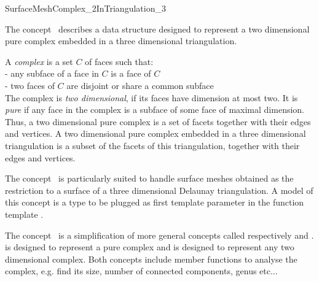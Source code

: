 

\begin{ccRefConcept}{SurfaceMeshComplex_2InTriangulation_3}


\ccDefinition
  
The concept \ccRefName\ describes a data structure
designed  to represent a  two dimensional pure complex 
embedded in a three dimensional triangulation.

A {\em complex} is a set $C$ of faces such that:\\
- any subface of a face in $C$ is a face of $C$ \\
- two faces of $C$ are disjoint or share a common subface \\
The complex is {\em two dimensional}, if its faces have dimension at most
two. It is {\em pure} if any face in the complex is a subface
of some face of maximal dimension.
Thus, a two dimensional pure complex is a set of facets
together with their edges and vertices.
A  two dimensional pure complex  embedded 
in a three dimensional triangulation
is a subset of the  facets 
of this triangulation, together with their edges and vertices.



The concept \ccRefName\  is particularly suited to handle
surface meshes obtained as the restriction to a surface of 
a  three dimensional Delaunay triangulation.
A model of this concept is a type to be plugged as first template
parameter in the 
function template .


The concept \ccRefName\   is a simplification of more general concepts called
 respectively  and
.
 is  designed to represent a  pure complex
and  is designed to represent any
two dimensional complex. 
Both concepts include member functions to analyse the complex,
e.g. find its size, number of connected components, genus etc... 


\end{ccRefConcept}

